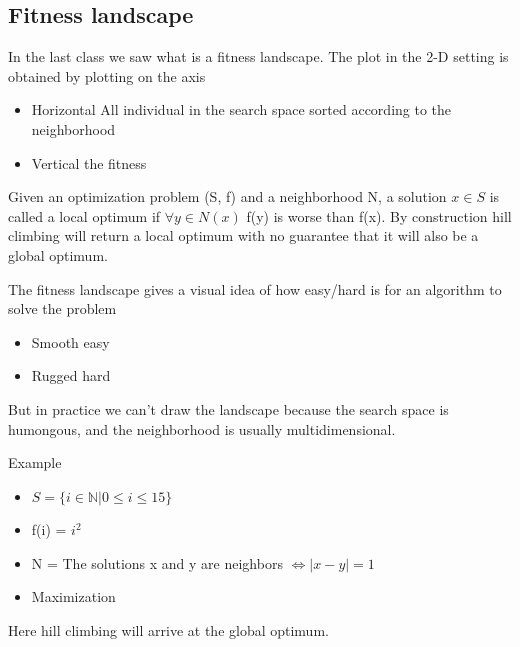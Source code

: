 \subsection{Fitness landscape}

In the last class we saw what is a fitness landscape. The plot in the 2-D setting is obtained by plotting on the axis

\begin{itemize}
    \item Horizontal \ra All individual in the search space sorted according to the neighborhood
    \item Vertical \ra the fitness
\end{itemize}

Given an optimization problem (S, f) and a neighborhood N, a solution $x \in S$ is called a local optimum if $\forall y \in N(x)$ f(y) is worse than f(x). By construction hill climbing will return a local optimum with no guarantee that it will also be a global optimum.

\vspace{10pt} 

The fitness landscape gives a visual idea of how easy/hard is for an algorithm to solve the problem
\begin{itemize}
    \item Smooth \ra easy
    \item Rugged \ra hard
\end{itemize}

But in practice we can't draw the landscape because the search space is humongous, and the neighborhood is usually multidimensional.

\vspace{10pt}

Example
\begin{itemize}
    \item $S = \{ i \in \mathbb{N} | 0 \le i \le 15 \}$
    \item f(i) = $i^2$
    \item N = The solutions x and y are neighbors $\iff |x-y| = 1$
    \item Maximization
\end{itemize}


Here hill climbing will arrive at the global optimum.

